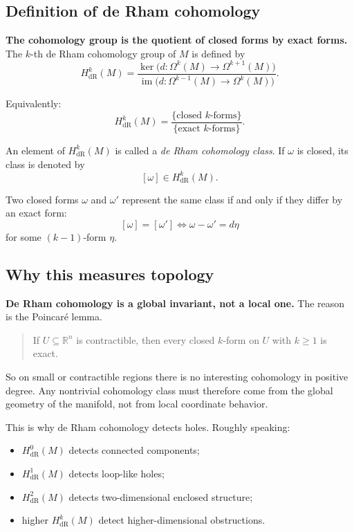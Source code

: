 \documentclass[12pt,a4paper]{article}
\theoremstyle{notespace}
\begin{document}
\subsection{Definition of de Rham cohomology}

\textbf{The cohomology group is the quotient of closed forms by exact forms.} The \(k\)-th de Rham cohomology group of \(M\) is defined by
\[
H^k_{\mathrm{dR}}(M)
=
\frac{\ker\bigl(d:\Omega^k(M)\to \Omega^{k+1}(M)\bigr)}
{\operatorname{im}\bigl(d:\Omega^{k-1}(M)\to \Omega^k(M)\bigr)}.
\]

Equivalently:
\[
H^k_{\mathrm{dR}}(M)
=
\frac{\{\text{closed \(k\)-forms}\}}
{\{\text{exact \(k\)-forms}\}}.
\]

An element of \(H^k_{\mathrm{dR}}(M)\) is called a \emph{de Rham cohomology class}. If \(\omega\) is closed, its class is denoted by
\[
[\omega]\in H^k_{\mathrm{dR}}(M).
\]

Two closed forms \(\omega\) and \(\omega'\) represent the same class if and only if they differ by an exact form:
\[
[\omega]=[\omega']
\iff
\omega-\omega'=d\eta
\]
for some \((k-1)\)-form \(\eta\).

\subsection{Why this measures topology}

\textbf{De Rham cohomology is a global invariant, not a local one.} The reason is the Poincar\'e lemma.

\begin{quote}
	If \(U\subseteq \mathbb{R}^n\) is contractible, then every closed \(k\)-form on \(U\) with \(k\ge 1\) is exact.
\end{quote}

So on small or contractible regions there is no interesting cohomology in positive degree. Any nontrivial cohomology class must therefore come from the global geometry of the manifold, not from local coordinate behavior.

This is why de Rham cohomology detects holes. Roughly speaking:

\begin{itemize}
	\item \(H^0_{\mathrm{dR}}(M)\) detects connected components;
	\item \(H^1_{\mathrm{dR}}(M)\) detects loop-like holes;
	\item \(H^2_{\mathrm{dR}}(M)\) detects two-dimensional enclosed structure;
	\item higher \(H^k_{\mathrm{dR}}(M)\) detect higher-dimensional obstructions.
\end{itemize}
\end{document}

